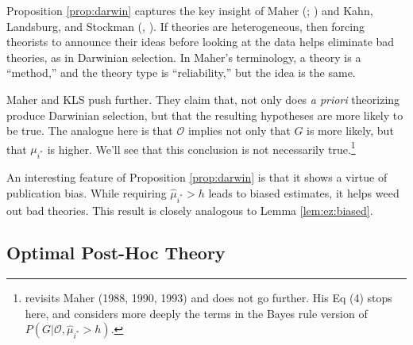 \documentclass[12pt,english]{article}
\theoremstyle{plain}
\theoremstyle{plain}
\begin{document}
Proposition \ref{prop:darwin} captures the key insight of Maher (\citeyear{maher1988prediction}; \citeyear{maher1990prediction}) and Kahn, Landsburg, and Stockman (\citeyear{kahn1992novel}, \citeyear{kahn1996positive}). If theories are heterogeneous, then forcing theorists to announce their ideas before looking at the data helps eliminate bad theories, as in Darwinian selection.  In Maher's terminology, a theory  is a ``method,'' and the theory type is ``reliability,'' but the idea is the same. 


Maher and KLS push further. They claim that, not only does \emph{a priori} theorizing produce Darwinian selection, but that the resulting hypotheses are more likely to be true. The analogue here is that $\mathcal{O}$ implies not only that $G$ is more likely, but that $\mu_{i^\ast}$ is higher. We'll see that this conclusion is not necessarily true.\footnote{\citet{barnes1996discussion} revisits Maher (1988, 1990, 1993) and does not go further. His Eq (4) stops here, and considers more deeply the terms in the Bayes rule version of $P\left(G|\mathcal{O},\hat{\mu}_{i^{\ast}}>h\right)$. 
} 

An interesting feature of Proposition \ref{prop:darwin} is that it shows a virtue of publication bias. While requiring $\hat{\mu}_{i^{\ast}}>h$ leads to biased estimates, it helps weed out bad theories. This result is closely analogous to Lemma \ref{lem:ez:biased}. 




\subsection{Optimal Post-Hoc Theory}
\end{document}
